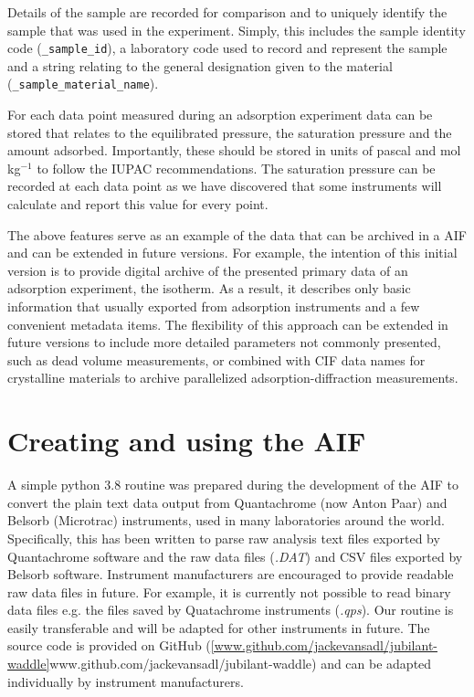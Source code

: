 \documentclass[journal=langd5,manuscript=article]{achemso}
\begin{document}
Details of the sample are recorded for comparison and to uniquely identify the sample that was used in the experiment.
Simply, this includes the sample identity code (\texttt{\_sample\_id}), a laboratory code used to record and represent the sample and a string relating to the general designation given to the material (\texttt{\_sample\_material\_name}).

For each data point measured during an adsorption experiment data can be stored that relates to the equilibrated pressure, the saturation pressure and the amount adsorbed. Importantly, these should be stored in units of pascal and mol$\,$kg$^{-1}$ to follow the IUPAC recommendations.\cite{10.1515/pac-2014-1117}
The saturation pressure can be recorded at each data point as we have discovered that some instruments will calculate and report this value for every point.

The above features serve as an example of the data that can be archived in a AIF and can be extended in future versions.
For example, the intention of this initial version is to provide digital archive of the presented primary data of an adsorption experiment, the isotherm.
As a result, it describes only basic information that usually exported from adsorption instruments and a few convenient metadata items.
The flexibility of this approach can be extended in future versions to include more detailed parameters not commonly presented, such as dead volume measurements, or combined with CIF data names for crystalline materials to archive parallelized adsorption-diffraction measurements.

\section{Creating and using the AIF}
A simple python 3.8 routine was prepared during the development of the AIF to convert the plain text data output from Quantachrome (now Anton Paar) and Belsorb (Microtrac) instruments, used in many laboratories around the world.
Specifically, this has been written to parse raw analysis text files exported by Quantachrome software and the raw data files (\textit{.DAT}) and CSV files exported by Belsorb software.
Instrument manufacturers are encouraged to provide readable raw data files in future.
For example, it is currently not possible to read binary data files e.g. the files saved by Quatachrome instruments (\textit{.qps}).
Our routine is easily transferable and will be adapted for other instruments in future.
The source code is provided on GitHub (\ref{www.github.com/jackevansadl/jubilant-waddle}{www.github.com/jackevansadl/jubilant-waddle}) and can be adapted individually by instrument manufacturers.
\end{document}
